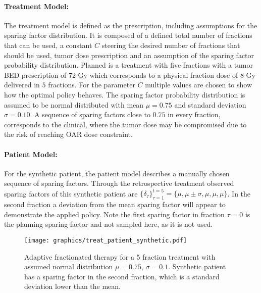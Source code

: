 \documentclass[\relativeRoot/ada.tex]{subfiles}
\begin{document}
\paragraph{Treatment Model:} The treatment model is defined as the prescription, including assumptions for the sparing factor distribution. It is composed of a defined total number of fractions that can be used, a constant $C$ steering the desired number of fractions that should be used, tumor dose prescription and an assumption of the sparing factor probability distribution. Planned is a treatment with five fractions with a tumor BED prescription of $72$ Gy which corresponds to a physical fraction dose of $8$ Gy delivered in $5$ fractions. For the parameter $C$ multiple values are chosen to show how the optimal policy behaves. The sparing factor probability distribution is assumed to be normal distributed with mean $\mu=0.75$ and standard deviation $\sigma = 0.10$. A sequence of sparing factors close to $0.75$ in every fraction, corresponds to the clinical, where the tumor dose may be compromised due to the risk of reaching OAR dose constraint.

\paragraph{Patient Model:} For the synthetic patient, the patient model describes a manually chosen sequence of sparing factors. Through the retrospective treatment observed sparing factors of this synthetic patient are $\{\delta_\tau\}_{\tau=1}^{t=5} = \{\mu, \mu \pm \sigma, \mu,\mu, \mu \}$. In the second fraction a deviation from the mean sparing factor will appear to demonstrate the applied policy. Note the first sparing factor in fraction $\tau=0$ is the planning sparing factor and not sampled here, as it is not used.

\begin{figure}[!htb]
    \centering
    \texttt{[image: graphics/treat\_patient\_synthetic.pdf]}
    \caption{Adaptive fractionated therapy for a 5 fraction treatment with assumed normal distribution $\mu=0.75$, $\sigma=0.1$. Synthetic patient has a sparing factor in the second fraction, which is a standard deviation lower than the mean.}
    \label{fig:treat_patient_synthetic}
\end{figure}
\end{document}
